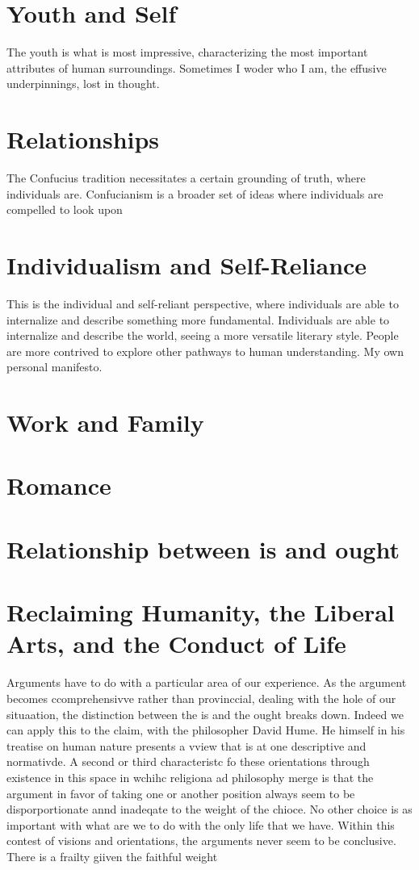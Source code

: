 \documentclass[12pt,letterpaper]{article}
\begin{document}
\section{Youth and Self}

The youth is what is most impressive, characterizing the most important attributes of human surroundings.  Sometimes I woder who I am, the effusive underpinnings, lost in thought.

\section{Relationships}
The Confucius tradition necessitates a certain grounding of truth, where individuals are.  Confucianism is a broader set of ideas where individuals are compelled to look upon

\section{Individualism and Self-Reliance}
This is the individual and self-reliant perspective, where individuals are able to internalize and describe something more fundamental.  Individuals are able to internalize and describe the world, seeing a more versatile literary style.  People are more contrived to explore other pathways to human understanding.  My own personal manifesto.

\section{Work and Family}

\section{Romance}

\section{Relationship between is and ought}

\section{Reclaiming Humanity, the Liberal Arts, and the Conduct of Life}
Arguments have to do with a particular area of our experience.  As the argument becomes ccomprehensivve rather than provinccial, dealing with the hole of our situaation, the distinction between the is and the ought breaks down.  Indeed we can apply this to the claim, with the philosopher David Hume.  He himself in his treatise on human nature presents a vview that is at one descriptive and normativde.  A second or third characteristc fo these orientations through existence in this space in wchihc religiona ad philosophy merge is that the argument in favor of taking one or another position always seem to be disporportionate annd inadeqate to the weight  of the chioce.  No other choice is as important with what are we to do with the only life that we have.  Within this contest of visions and orientations, the arguments never seem to be conclusive.  There is a frailty giiven the faithful weight 
\end{document}
